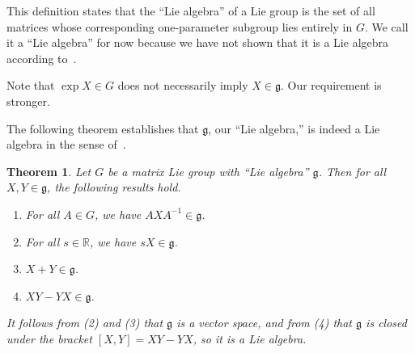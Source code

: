 \documentclass[12pt]{article}
\newcommand{\R}{\mathbb{R}}
\newcommand{\g}{\mathfrak{g}}
\newtheorem{them}{Theorem}[section]
\theoremstyle{definition}
\theoremstyle{definition}
\theoremstyle{definition}
\theoremstyle{definition}
\theoremstyle{definition}
\theoremstyle{definition}
\theoremstyle{definition}
\theoremstyle{definition}
\begin{document}
\par{This definition states that the “Lie algebra”
of a Lie group is the set of all matrices whose
corresponding one-parameter subgroup lies entirely
in $G$. We call it a “Lie algebra” for now because
we have not shown that it is a Lie algebra
according to~.}

\vspace{6pt}
\par{Note that $\exp X \in G$ does not
necessarily imply $X \in \g$. Our requirement is
stronger.}

\vspace{6pt}
\par{The following theorem establishes that $\g$, our “Lie algebra,” is indeed a Lie algebra in the sense of~.}

\begin{them}
Let $G$ be a matrix Lie group with “Lie algebra”
$\g$. Then for all $X, Y \in \g$, the following
results hold.

\begin{enumerate}
    \item For all $A \in G$, we have $AXA^{-1} \in \g$.
    \item For all $s \in \R$, we have $sX \in \g$.
    \item $X + Y \in \g$.
    \item $XY - YX \in \g$.
\end{enumerate}

It follows from (2) and (3) that $\g$ is a vector
space, and from (4) that $\g$ is closed under the
bracket $[X,Y] = XY - YX$, so it is a Lie algebra.
\end{them}
\end{document}
